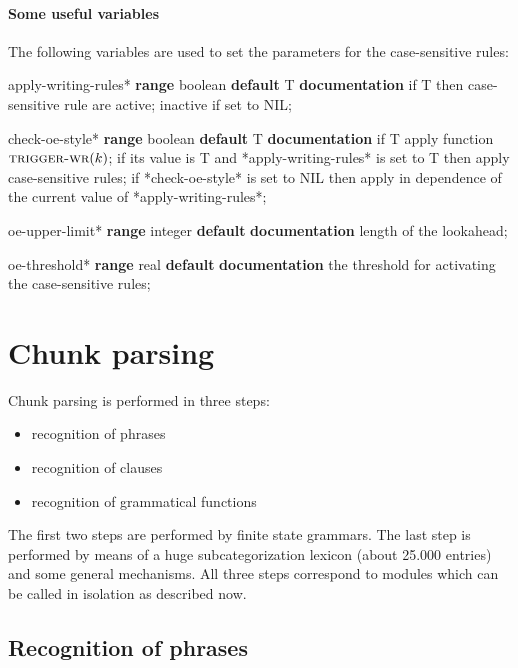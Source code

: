 \paragraph{Some useful variables}
The following variables are used to set the parameters for the 
case-sensitive rules:
\vspace{5mm}

 {\sc *apply-writing-rules*}
{\bf range} {\sc boolean}
{\bf default} {\sc T}
{\bf documentation} if T then case-sensitive rule 
are active; inactive if set to NIL;
\vspace{5mm}

 {\sc *check-oe-style*}
{\bf range} {\sc boolean}
{\bf default} {\sc T}
{\bf documentation} if T apply function $\mbox{{\sc trigger-wr}}(k)$;
if its value is T and *apply-writing-rules* is set to T
then apply case-sensitive rules; if *check-oe-style* is set to NIL
then apply in dependence of the current value of *apply-writing-rules*;
\vspace{3mm}

 {\sc *oe-upper-limit*}
{\bf range} {\sc integer}
{\bf default} {}
{\bf documentation} length of the lookahead;
\vspace{3mm}

 {\sc *oe-threshold*}
{\bf range} {\sc real}
{\bf default} {}
{\bf documentation} the threshold for activating the case-sensitive
rules;


\section{Chunk parsing}
Chunk parsing is performed in three steps:
\begin{itemize}
\item   recognition of phrases
\item   recognition of clauses
\item   recognition of grammatical functions
\end{itemize}

The first two steps are performed by finite state grammars. The
last step is performed by means of a huge subcategorization lexicon
(about 25.000 entries) and some general mechanisms. 
All three steps correspond to modules which
can be called in isolation as described now.

\subsection{Recognition of phrases}

